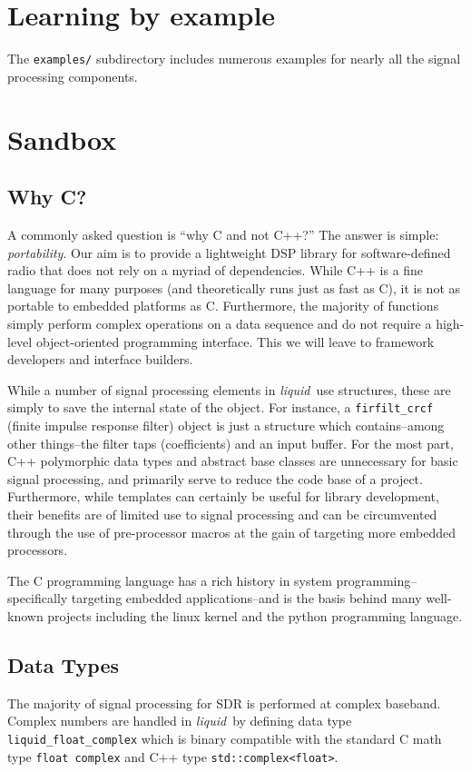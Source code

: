 \documentclass[11pt,twoside]{report}
\newcommand{\liquid}{{\it liquid}}
\begin{document}
\section{Learning by example}
The {\tt examples/} subdirectory includes numerous examples for nearly all the
signal processing components.

\section{Sandbox}

\subsection{Why C?}
A commonly asked question is ``why C and not C++?''
The answer is simple: {\em portability}.
Our aim is to provide a lightweight DSP library for software-defined radio
that does not rely on a myriad of dependencies.
While C++ is a fine language for many purposes (and theoretically runs just as
fast as C), it is not as portable to embedded platforms as C.
Furthermore, the majority of functions simply perform complex operations on a
data sequence and do not require a high-level object-oriented programming
interface.
This we will leave to framework developers and interface builders.

While a number of signal processing elements in \liquid\ use structures, these
are simply to save the internal state of the object.
For instance, a {\tt firfilt\_crcf} (finite impulse response filter) object
is just a structure which contains--among other things--the filter taps
(coefficients) and an input buffer.
For the most part, C++ polymorphic data types and abstract base classes are
unnecessary for basic signal processing, and primarily serve to reduce the
code base of a project.
Furthermore, while templates can certainly be useful for library development,
their benefits are of limited use to signal processing and can be circumvented
through the use of pre-processor macros at the gain of targeting more embedded
processors.

The C programming language has a rich history in system programming--
specifically targeting embedded applications--and is the basis behind many
well-known projects including the linux kernel and the python programming
language.

\subsection{Data Types}
The majority of signal processing for SDR is performed at complex baseband.
Complex numbers are handled in \liquid\ by defining data type
{\tt liquid\_float\_complex} which is binary compatible with the standard
C math type {\tt float complex} and C++ type {\tt std::complex<float>}.
\end{document}
